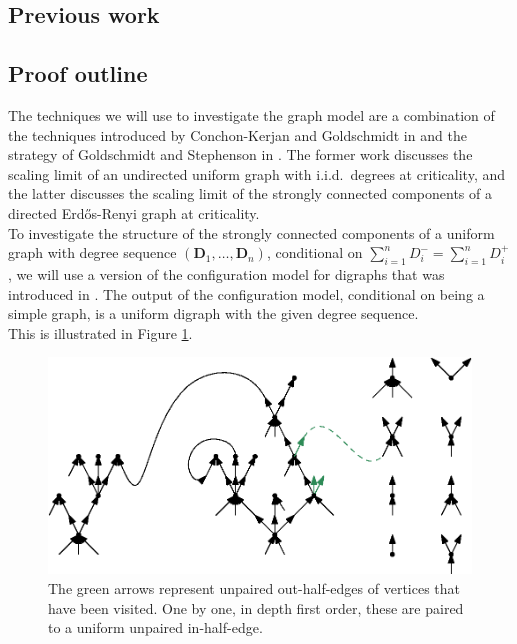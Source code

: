 \subsection{Previous work}


\subsection{Proof outline}
The techniques we will use to investigate the graph model are a combination of the techniques introduced by Conchon-Kerjan and Goldschmidt in \cite{Conchon2018} and the strategy of Goldschmidt and Stephenson in \cite{Goldschmidt2019}. The former work discusses the scaling limit of an undirected uniform graph with i.i.d.\ degrees at criticality, and the latter discusses the scaling limit of the strongly connected components of a directed Erd\H{o}s-Renyi graph at criticality.\\
To investigate the structure of the strongly connected components of a uniform graph with degree sequence $(\mathbf{D}_1,\dots,\mathbf{D}_n)$, conditional on $\sum_{i=1}^n D^-_i=\sum_{i=1}^n D^+_i$, we will use a version of the configuration model for digraphs that was introduced in \cite{Cooper2004}. The output of the configuration model, conditional on being a simple graph, is a uniform digraph with the given degree sequence. \\
 This is illustrated in Figure \ref{fig.configuration model}. 
\begin{figure}
    \centering
    \includegraphics[scale=0.6]{Content/Pictures/configuration_model.eps}
    \caption{The green arrows represent unpaired out-half-edges of vertices that have been visited. One by one, in depth first order, these are paired to a uniform unpaired in-half-edge.}
    \label{fig.configuration model}
\end{figure}\\

